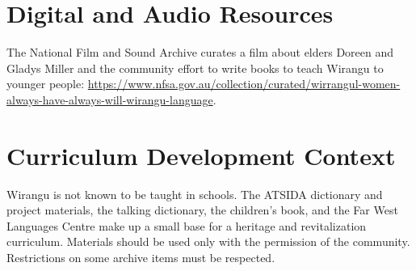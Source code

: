 \documentclass[12pt]{article}
\begin{document}
\section{Digital and Audio Resources}
The National Film and Sound Archive curates a film about elders Doreen and Gladys Miller and the community effort to write books to teach Wirangu to younger people: \url{https://www.nfsa.gov.au/collection/curated/wirrangul-women-always-have-always-will-wirangu-language}.

\section{Curriculum Development Context}
Wirangu is not known to be taught in schools. The ATSIDA dictionary and project materials, the talking dictionary, the children's book, and the Far West Languages Centre make up a small base for a heritage and revitalization curriculum. Materials should be used only with the permission of the community. Restrictions on some archive items must be respected.
\end{document}
